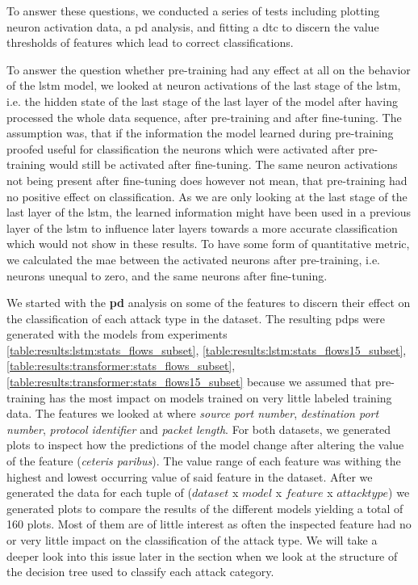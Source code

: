 To answer these questions, we conducted a series of tests including plotting neuron activation data, a \gls{pd} analysis, and fitting a \gls{dtc} to discern the value thresholds of features which lead to correct classifications. 

To answer the question whether pre-training had any effect at all on the behavior of the \gls{lstm} model, we looked at neuron activations of the last stage of the \gls{lstm}, i.e. the hidden state of the last stage of the last layer of the model after having processed the whole data sequence, after pre-training and after fine-tuning. The assumption was, that if the information the model learned during pre-training proofed useful for classification the neurons which were activated after pre-training would still be activated after fine-tuning. The same neuron activations not being present after fine-tuning does however not mean, that pre-training had no positive effect on classification. As we are only looking at the last stage of the last layer of the \gls{lstm}, the learned information might have been used in a previous layer of the \gls{lstm} to influence later layers towards a more accurate classification which would not show in these results. To have some form of quantitative metric, we calculated the \gls{mae} between the activated neurons after pre-training, i.e. neurons unequal to zero, and the same neurons after fine-tuning. 

We started with the \textbf{\gls{pd}} analysis on some of the features
to discern their effect on the classification of each attack type in the dataset. 
The resulting \glspl{pdp} were generated with the models from experiments \ref{table:results:lstm:stats_flows_subset},
\ref{table:results:lstm:stats_flows15_subset}, \ref{table:results:transformer:stats_flows_subset}, \ref{table:results:transformer:stats_flows15_subset} because we assumed that pre-training has the most impact on models trained on very little labeled training data. The features we looked at where \textit{source port number}, \textit{destination port number}, \textit{protocol identifier} and \textit{packet length}.
For both datasets, we generated plots to inspect how the predictions of the model change after altering the value of the feature (\textit{ceteris paribus}). The value range of each feature was withing the highest and lowest occurring value of said feature in the dataset. After we generated the data for each tuple of ($dataset$ x $model$ x $feature$ x $attack type$) we generated plots to compare the results of the different models yielding a total of 160 plots. Most of them are of little interest as often the inspected feature had no or very little impact on the classification of the attack type. We will take a deeper look into this issue later in the section when we look at the structure of the decision tree used to classify each attack category. 


